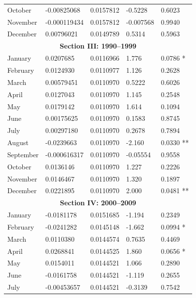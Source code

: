 \documentclass[11pt, english]{article}
\begin{document}
\begin{center}
\begin{longtable}{p{2cm}p{2cm}p{2cm}p{2cm}p{2cm}}
                October & -0.00825068 & 0.0157812 & -0.5228 & 0.6023\\
                November & -0.000119434 & 0.0157812 & -0.007568 & 0.9940\\
                December & 0.00796021 & 0.0149789 & 0.5314 & 0.5963\\
                \hline
                \multicolumn{5}{c}{\textbf{Section III: 1990--1999}}\\ 
		\hline
                January & 0.0207685 & 0.0116966 & 1.776 & 0.0786 *\\
                February & 0.0124930 & 0.0110977 & 1.126 & 0.2628\\  
                March & 0.00579451 & 0.0110970 & 0.5222 & 0.6026\\
                April & 0.0127043 & 0.0110970 & 1.145 & 0.2548\\
                May & 0.0179142 & 0.0110970 & 1.614 & 0.1094\\
                June & 0.00175625 & 0.0110970 & 0.1583 & 0.8745\\
                July & 0.00297180 & 0.0110970 & 0.2678 & 0.7894\\
                August & -0.0239663 & 0.0110970 & -2.160 & 0.0330 **\\
                September & -0.000616317 & 0.0110970 & -0.05554 & 0.9558\\
                October & 0.0136146 & 0.0110970 & 1.227 & 0.2226\\
                November & 0.0146467 & 0.0110970 & 1.320 & 0.1897\\
                December & 0.0221895 & 0.0110970 & 2.000 & 0.0481 **\\
                \hline
                \multicolumn{5}{c}{\textbf{Section IV: 2000--2009}}\\
		\hline
                January & -0.0181178 & 0.0151685 & -1.194 & 0.2349\\
                February & -0.0241282 & 0.0145148 & -1.662 & 0.0994 *\\  
                March & 0.0110380 & 0.0144574 & 0.7635 & 0.4469\\
                April & 0.0268841 & 0.0144525 & 1.860 & 0.0656 *\\
                May & 0.0154011 & 0.0144521 & 1.066 & 0.2890\\
                June & -0.0161758 & 0.0144521 & -1.119 & 0.2655\\
                July & -0.00453657 & 0.0144521 & -0.3139 & 0.7542\\

\end{longtable}
\end{center}
\end{document}
